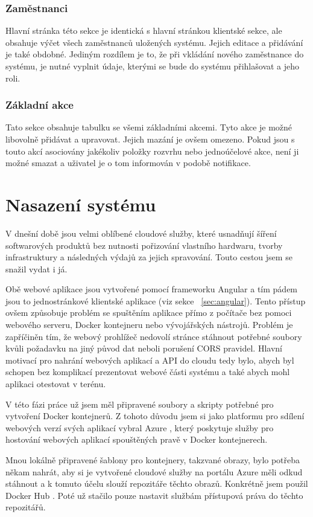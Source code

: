 \documentclass[
  glossaries,
]{kidiplom}
\begin{document}
\subsubsection{Zaměstnanci}
Hlavní stránka této sekce je identická s hlavní stránkou klientské sekce, ale obsahuje výčet všech zaměstnanců uložených systému. Jejich editace a přidávání je také obdobné. Jediným rozdílem je to, že při vkládání nového zaměstnance do systému, je nutné vyplnit údaje, kterými se bude do systému přihlašovat a jeho roli.

\subsubsection{Základní akce}
Tato sekce obsahuje tabulku se všemi základními akcemi. Tyto akce je možné libovolně přidávat a upravovat. Jejich mazání je ovšem omezeno. Pokud jsou s touto akcí asociovány jakékoliv položky rozvrhu nebo jednoúčelové akce, není ji možné smazat a uživatel je o tom informován v podobě notifikace.
\newpage


\section{Nasazení systému}
V dnešní době jsou velmi oblíbené cloudové služby, které usnadňují šíření softwarových produktů bez nutnosti pořizování vlastního hardwaru, tvorby infrastruktury a následných výdajů za jejich spravování. Touto cestou jsem se snažil vydat i já.

Obě webové aplikace jsou vytvořené pomocí frameworku Angular a tím pádem jsou to jednostránkové klientské aplikace (viz sekce ~\ref{sec:angular}). Tento přístup ovšem způsobuje problém se spuštěním aplikace přímo z počítače bez pomoci webového serveru, Docker kontejneru nebo vývojářských nástrojů. Problém je zapříčiněn tím, že webový prohlížeč nedovolí stránce stáhnout potřebné soubory kvůli požadavku na jiný původ dat neboli porušení CORS \cite{20} pravidel. Hlavní motivací pro nahrání webových aplikací a API do cloudu tedy bylo, abych byl schopen bez komplikací prezentovat webové části systému a také abych mohl aplikaci otestovat v terénu.

V této fázi práce už jsem měl připravené soubory a skripty potřebné pro vytvoření Docker kontejnerů. Z tohoto důvodu jsem si jako platformu pro sdílení webových verzí svých aplikací vybral Azure \cite{21}, který poskytuje služby pro hostování webových aplikací spouštěných pravě v Docker kontejnerech.

Mnou lokálně připravené šablony pro kontejnery, takzvané obrazy, bylo potřeba někam nahrát, aby si je vytvořené cloudové služby na portálu Azure měli odkud stáhnout a k tomuto účelu slouží repozitáře těchto obrazů. Konkrétně jsem použil Docker Hub \cite{22}. Poté už stačilo pouze nastavit službám přístupová práva do těchto repozitářů.
\end{document}
